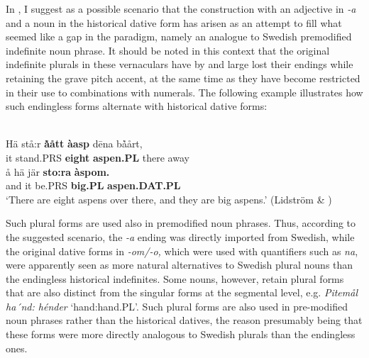 \z

In \citet{Dahl2008}, I suggest as a possible scenario that the construction with an adjective in\textit{ {}-a} and a noun in the historical dative form has arisen as an attempt to fill what seemed like a gap in the paradigm, namely an analogue to Swedish premodified indefinite noun phrase. It should be noted in this context that the original indefinite plurals in these vernaculars have by and large lost their endings while retaining the grave pitch accent, at the same time as they have become restricted in their use to combinations with numerals. The following example illustrates how such endingless forms alternate with historical dative forms: 


\ea \label{} 
\\
\gll Hä  stå:r  \textbf{\`{å}ått} \textbf{àasp} d\=ena  b\`{å}årt,\\
it  stand.PRS  \textbf{eight} \textbf{aspen.PL} there  away\\
\gll å  hä  jär  \textbf{sto:ra} \textbf{àspom.}\\
and  it  be.PRS  \textbf{big.PL} \textbf{aspen.DAT.PL}\\
\glt ‘There are eight aspens over there, and they are big aspens.’ (Lidström \& \citet[20]{Berglund1991}) 

\z

Such plural forms are used also in premodified noun phrases. Thus, according to the suggested scenario, the\textit{ {}-a} ending was directly imported from Swedish, while the original dative forms in\textit{ {}-om/-o,} which were used with quantifiers such as \textit{na},\textit{ }were apparently seen as more natural alternatives to Swedish plural nouns than the endingless historical indefinites. Some nouns, however, retain plural forms that are also distinct from the singular forms at the segmental level, e.g. \textit{Pitemål} \textit{ha´nd: hénder} ‘hand:hand.PL’.  Such plural forms are also used in pre-modified noun phrases rather than the historical datives, the reason presumably being that these forms were more directly analogous to Swedish plurals than the endingless ones. 


